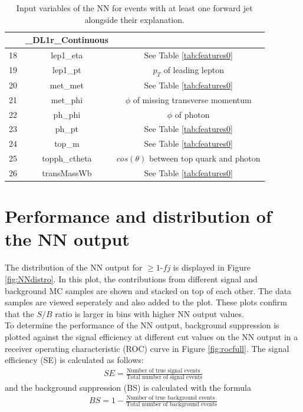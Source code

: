 \begin{table}
\begin{tabular}{c|c|c}
        &\_DL1r\_Continuous &\\\hline
        18 &                          lep1\_eta &See Table \ref{tab:features0}\\\hline
        19 &                           lep1\_pt &$p_T$ of leading lepton\\\hline
        20 &                           met\_met &See Table \ref{tab:features0}\\\hline
        21 &                           met\_phi &$\phi$ of missing transverse momentum\\\hline
        22 &                            ph\_phi &$\phi$ of photon\\\hline
        23 &                             ph\_pt &See Table \ref{tab:features0}\\\hline
        24 &                             top\_m &See Table \ref{tab:features0}\\\hline
        25 &                      topph\_ctheta &$cos(\theta)$ between top quark and photon\\\hline
        26 &                       transMassWb  &See Table \ref{tab:features0}\\\hline
        \bottomrule
    \end{tabular}
    \caption{Input variables of the NN for events with at least one forward jet alongside their explanation.}
    \label{tab:features1}
\end{table}


\section{Performance and distribution of the NN output}
The distribution of the NN output for $\geq 1\text{-}fj$ is displayed in Figure \ref{fig:NNdistro}. In this plot, the contributions from different signal and background MC samples are shown and stacked on top of each other. The data samples are viewed seperately and also added to the plot. 
These plots confirm that the $S/B$ ratio is larger in bins with higher NN output values.  \\ 
To determine the performance of the NN output, background suppression is plotted against the signal efficiency at different cut values on the NN output in a receiver operating characteristic (ROC) curve in Figure \ref{fig:rocfull}. 
The signal efficiency (SE) is calculated as follows: 
\begin{align*}
    SE = \frac{\text{Number of true signal events }}{\text{Total number of signal events}}
\end{align*}
and the background suppression (BS) is calculated with the formula
\begin{align*}
    BS = 1 - \frac{\text{Number of true background events }}{\text{Total number of background events}}
\end{align*}




